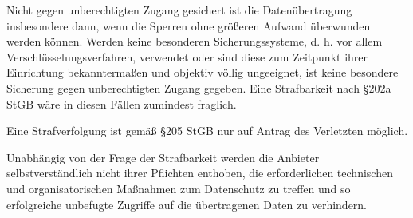 \documentclass[10pt,a4paper]{article}
\begin{document}
Nicht gegen unberechtigten Zugang gesichert ist die Datenübertragung insbesondere dann, wenn die Sperren ohne größeren Aufwand überwunden werden können. Werden keine besonderen Sicherungssysteme, d. h. vor allem Verschlüsselungsverfahren, verwendet oder sind diese zum Zeitpunkt ihrer Einrichtung bekanntermaßen und objektiv völlig ungeeignet, ist keine besondere Sicherung gegen unberechtigten Zugang gegeben. Eine Strafbarkeit nach §202a StGB wäre in diesen Fällen zumindest fraglich.

Eine Strafverfolgung ist gemäß §205 StGB nur auf Antrag des Verletzten möglich.

Unabhängig von der Frage der Strafbarkeit werden die Anbieter selbstverständlich nicht ihrer Pflichten enthoben, die erforderlichen technischen und organisatorischen Maßnahmen zum Datenschutz zu treffen und so erfolgreiche unbefugte Zugriffe auf die übertragenen Daten zu verhindern.
\end{document}
